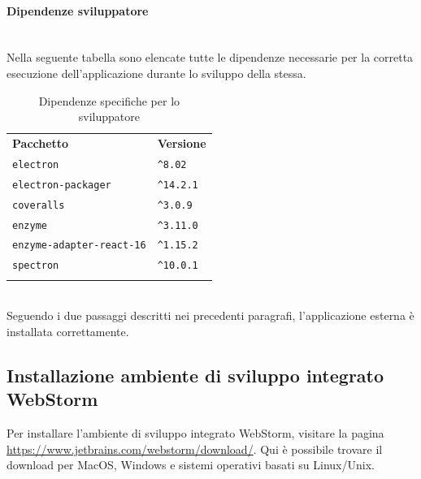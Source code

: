 \paragraph*{Dipendenze sviluppatore}\mbox{}\\ [1mm]
Nella seguente tabella sono elencate tutte le dipendenze necessarie per la corretta esecuzione dell'applicazione durante lo sviluppo della stessa.
	\setcounter{table}{1}
	\begin{longtable} {
		>{}p{65mm} 
		>{}p{30mm}
		}
    \rowcolor{gray!50}
    \textbf{Pacchetto} & \textbf{Versione} \TBstrut \\ [2mm]
    \verb|electron| & \verb|^8.02| \TBstrut \\ [2mm]
    \verb|electron-packager| & \verb|^14.2.1| \TBstrut \\ [2mm]
    \verb|coveralls| & \verb|^3.0.9| \TBstrut \\ [2mm]
    \verb|enzyme| & \verb|^3.11.0| \TBstrut \\ [2mm]
    \verb|enzyme-adapter-react-16| & \verb|^1.15.2| \TBstrut \\ [2mm]
    \verb|spectron| & \verb|^10.0.1| \TBstrut \\ [2mm]
    \rowcolor{white}
    \caption{Dipendenze specifiche per lo sviluppatore}
    \end{longtable}
    \mbox{}\\ [1mm]
Seguendo i due passaggi descritti nei precedenti paragrafi, l'applicazione esterna è installata correttamente.

\subsection{Installazione ambiente di sviluppo integrato WebStorm}
Per installare l'ambiente di sviluppo integrato WebStorm, visitare la pagina \url{https://www.jetbrains.com/webstorm/download/}. Qui è possibile trovare il download per MacOS, Windows e sistemi operativi basati su Linux/Unix.
\\

